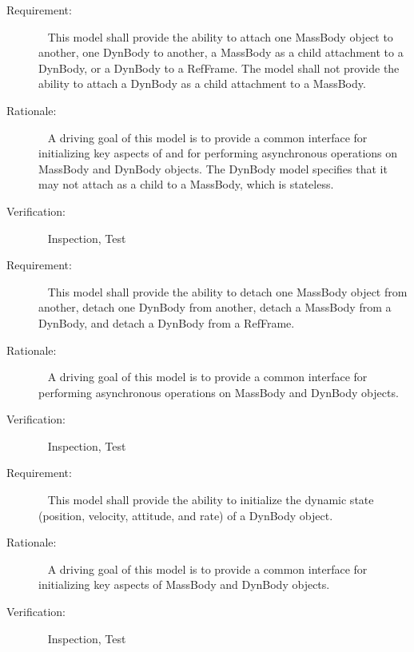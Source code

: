 \label{reqt:overview:mass_attach}
\begin{description}
\item[Requirement:]\ \newline
  This model shall provide the ability to attach one MassBody object
  to another, one DynBody to another, a MassBody as a child attachment to a
  DynBody, or a DynBody to a RefFrame. The model shall not provide the ability to attach a DynBody as a
  child attachment to a MassBody.

\item[Rationale:]\ \newline
  A driving goal of this model is to provide a common interface
  for initializing key aspects of
  and for performing asynchronous operations on
  MassBody and DynBody objects. The DynBody model specifies that it may not
  attach as a child to a MassBody, which is stateless.

\item[Verification:]\ \newline
  Inspection, Test
\end{description}

\label{reqt:overview:mass_detach}
\begin{description}
\item[Requirement:]\ \newline
  This model shall provide the ability to detach one MassBody object
  from another, detach one DynBody from another, detach a MassBody from a
  DynBody, and detach a DynBody from a RefFrame.

\item[Rationale:]\ \newline
  A driving goal of this model is to provide a common interface
  for performing asynchronous operations on
  MassBody and DynBody objects.

\item[Verification:]\ \newline
  Inspection, Test
\end{description}

\label{reqt:overview:dyn_body_init}
\begin{description}
\item[Requirement:]\ \newline
  This model shall provide the ability to
  initialize the dynamic state (position, velocity,
  attitude, and rate) of a DynBody object.

\item[Rationale:]\ \newline
  A driving goal of this model is to provide a common interface
  for initializing key aspects of MassBody and DynBody objects.

\item[Verification:]\ \newline
  Inspection, Test
\end{description}

